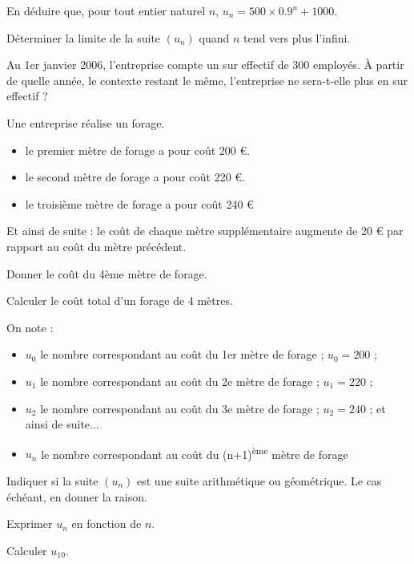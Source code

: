 \documentclass[a4paper,12pt]{scrartcl}
\begin{document}
En déduire que, pour tout entier naturel $n$, $u_n = 500 \times 0.9^n + 1000$.


Déterminer la limite de la suite $(u_n)$ quand $n$ tend vers plus l'infini.

\question{}
Au 1er janvier 2006, l'entreprise compte un sur effectif de 300 employés. À partir de quelle année, le contexte restant le même, l'entreprise ne sera-t-elle plus en sur effectif ?

Une entreprise réalise un forage.

\begin{itemize}
\item le premier mètre de forage a pour coût 200 €.
\item le second mètre de forage a pour coût 220 €.
\item le troisième mètre de forage a pour coût 240 €
\end{itemize}

Et ainsi de suite : le coût de chaque mètre supplémentaire augmente de 20 € par rapport au coût du mètre précédent.


\question{}
Donner le coût du 4ème mètre de forage.

\question{}
Calculer le coût total d'un forage de 4 mètres.


On note : 

\begin{itemize}
\item $u_0$ le nombre correspondant au coût du 1er mètre de forage ; $u_0 = 200$ ;
\item $u_1$ le nombre correspondant au coût du 2e mètre de forage ; $u_1 = 220$ ;
\item $u_2$ le nombre correspondant au coût du 3e mètre de forage ; $u_2 = 240$ ; et ainsi de suite...
\item $u_n$ le nombre correspondant au coût du (n+1)\textsuperscript{ème} mètre de forage 
\end{itemize}

\question{}
Indiquer si la suite $(u_n)$ est une suite arithmétique ou géométrique. Le cas échéant, en donner la raison.

\question{}
Exprimer $u_n$ en fonction de $n$.

\question{}
Calculer $u_{10}$.
\end{document}
